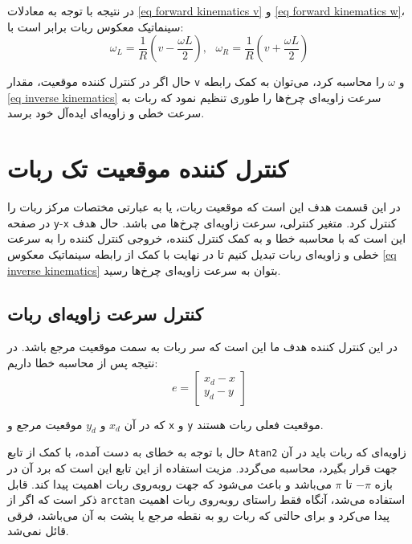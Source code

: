 در نتیجه با توجه به معادلات \ref{eq forward kinematics v} و \ref{eq forward kinematics w}، سینماتیک معکوس ربات برابر است با:
\begin{equation} \label{eq inverse kinematics}
\omega_L = \frac{1}{R}(v - \frac{\omega L}{2}),~~~  \omega_R = \frac{1}{R}(v + \frac{\omega L}{2})
\end{equation}

حال اگر در کنترل کننده موقعیت، مقدار \verb|v| و $\omega$ را محاسبه کرد، می‌توان به کمک رابطه \ref{eq inverse kinematics} سرعت زاویه‌ای چرخ‌ها را طوری تنظیم نمود که ربات به سرعت خطی و زاویه‌ای ایده‌آل خود برسد.

\section{کنترل کننده موقعیت تک ربات}

در این قسمت هدف این است که موقعیت ربات، یا به عبارتی مختصات مرکز ربات را در صفحه \verb|y|-\verb|x| کنترل کرد. متغیر کنترلی، سرعت زاویه‌ای چرخ‌ها می باشد. حال هدف این است که با محاسبه خطا و به کمک کنترل کننده، خروجی کنترل کننده را به سرعت خطی و زاویه‌ای ربات تبدیل کنیم تا در نهایت با کمک از رابطه سینماتیک معکوس \ref{eq inverse kinematics} بتوان به سرعت زاویه‌ای چرخ‌ها رسید.

\subsection{کنترل سرعت زاویه‌ای ربات}
در این کنترل ‌کننده هدف ما این است که سر ربات به سمت موقعیت مرجع باشد. در نتیجه پس از محاسبه خطا داریم:
\begin{equation}
e = 
\begin{bmatrix}
x_d - x \\
y_d - y
\end{bmatrix}
\end{equation}

که در آن $x_d$ و $y_d$ موقعیت مرجع و \verb|x| و \verb|y| موقعیت فعلی ربات هستند.

حال با توجه به خطای به دست آمده، با کمک از تابع \verb|Atan2| زاویه‌ای که ربات باید در آن جهت قرار بگیرد، محاسبه می‌گردد. مزیت استفاده از این تابع این است که برد آن در بازه
$-\pi$
تا
$\pi$
می‌باشد و باعث می‌شود که جهت رو‌به‌روی ربات اهمیت پیدا کند. قابل ذکر است که اگر از \verb|arctan| استفاده می‌شد، آنگاه فقط راستای رو‌به‌روی ربات اهمیت پیدا می‌کرد و برای حالتی که ربات رو به نقطه مرجع یا پشت به آن می‌باشد، فرقی قائل نمی‌شد.

